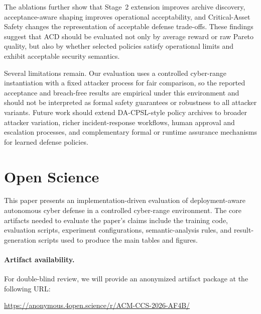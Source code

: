 \documentclass[sigconf,review,anonymous]{acmart}
\begin{document}
The ablations further show that Stage~2 extension improves archive discovery, acceptance-aware shaping improves operational acceptability, and Critical-Asset Safety changes the representation of acceptable defense trade-offs.
These findings suggest that ACD should be evaluated not only by average reward or raw Pareto quality, but also by whether selected policies satisfy operational limits and exhibit acceptable security semantics.

Several limitations remain.
Our evaluation uses a controlled cyber-range instantiation with a fixed attacker process for fair comparison, so the reported acceptance and breach-free results are empirical under this environment and should not be interpreted as formal safety guarantees or robustness to all attacker variants.
Future work should extend DA-CPSL-style policy archives to broader attacker variation, richer incident-response workflows, human approval and escalation processes, and complementary formal or runtime assurance mechanisms for learned defense policies.




\appendix

\section{Open Science}
\label{app:open-science}

This paper presents an implementation-driven evaluation of
deployment-aware autonomous cyber defense in a controlled cyber-range
environment. The core artifacts needed to evaluate the paper's claims
include the training code, evaluation scripts, experiment configurations,
semantic-analysis rules, and result-generation scripts used to produce
the main tables and figures.

\paragraph{Artifact availability.}
For double-blind review, we will provide an anonymized artifact package
at the following URL:

\begin{center}
\url{https://anonymous.4open.science/r/ACM-CCS-2026-AF4B/}
\end{center}
\end{document}

